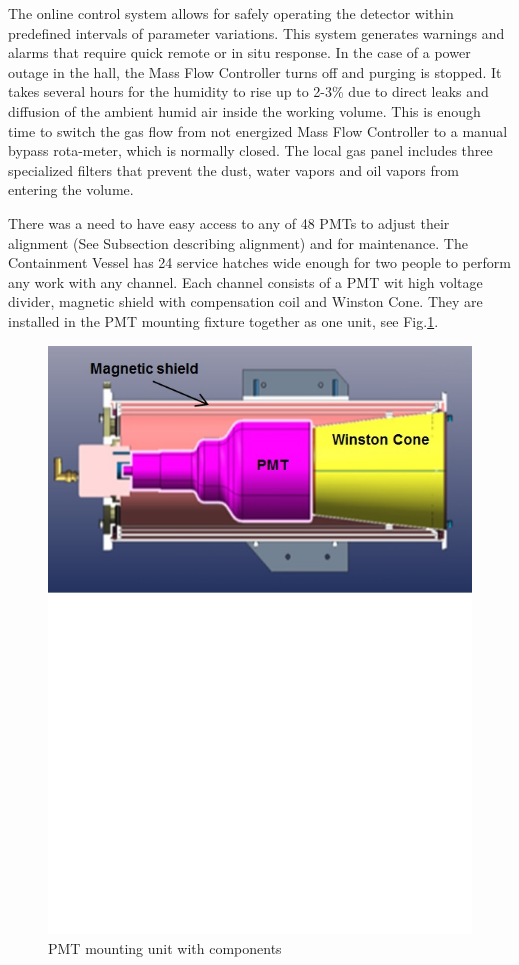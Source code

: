 \indent  The online control system allows for safely operating the detector within predefined intervals of parameter variations. This system generates warnings and alarms that require quick remote or in situ response. In the case of a power outage in the hall, the Mass Flow Controller turns off and purging is stopped. It takes several hours for the humidity to rise up to 2-3\% due to direct leaks and diffusion of the ambient humid air inside the working volume. This is enough time to switch the gas flow from not energized Mass Flow Controller to a manual bypass rota-meter, which is normally closed. The local gas panel includes three specialized filters that prevent the dust, water vapors and oil vapors from entering the volume.

\indent There was a need to have easy access to any of 48 PMTs to adjust their alignment (See Subsection describing alignment) and for maintenance. The Containment Vessel has 24 service hatches wide enough for two people to perform any work with any channel. Each channel consists of a PMT wit high voltage divider, magnetic shield with compensation coil and Winston Cone. They are installed in the PMT mounting fixture together as one unit, see Fig.\ref{fig:PMT_Mount}.

\begin{figure}[h]
    \centering
    \includegraphics[width=1.0\linewidth,trim={0 12cm 0 0},clip]{images/PMT_Mount.jpg}
    \caption{PMT mounting unit with components}
    \label{fig:PMT_Mount}
\end{figure}

